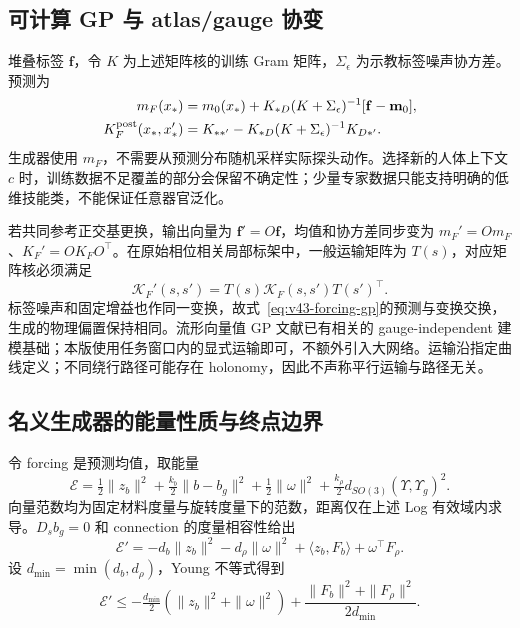 \documentclass[11pt,a4paper]{article}
\numberwithin{equation}{section}
\theoremstyle{definition}
\begin{document}
\subsection{可计算 GP 与 atlas/gauge 协变}
堆叠标签 $\mathbf f$，令 $K$ 为上述矩阵核的训练 Gram 矩阵，$\Sigma_\epsilon$ 为示教标签噪声协方差。预测为
\begin{align}
 m_F(x_*)&=m_0(x_*)+K_{*D}(K+\Sigma_\epsilon)^{-1}
                         [\mathbf f-\mathbf m_0],\\
 K_F^{\rm post}(x_*,x_*')&=K_{**'}-
     K_{*D}(K+\Sigma_\epsilon)^{-1}K_{D*'}.
 \label{eq:v43-forcing-gp}
\end{align}
生成器使用 $m_F$，不需要从预测分布随机采样实际探头动作。选择新的人体上下文 $c$ 时，训练数据不足覆盖的部分会保留不确定性；少量专家数据只能支持明确的低维技能类，不能保证任意器官泛化。

若共同参考正交基更换，输出向量为 $\mathbf f'=O\mathbf f$，均值和协方差同步变为 $m_F'=Om_F$、$K_F'=OK_FO^\top$。在原始相位相关局部标架中，一般运输矩阵为 $T(s)$，对应矩阵核必须满足
\begin{equation}
 \mathcal K_F'(s,s')=T(s)\mathcal K_F(s,s')T(s')^\top.
 \label{eq:v43-gauge-kernel}
\end{equation}
标签噪声和固定增益也作同一变换，故式~\eqref{eq:v43-forcing-gp}的预测与变换交换，生成的物理偏置保持相同。流形向量值 GP 文献已有相关的 gauge-independent 建模基础\cite{gpmanifold2021}；本版使用任务窗口内的显式运输即可，不额外引入大网络。运输沿指定曲线定义；不同绕行路径可能存在 holonomy，因此不声称平行运输与路径无关。

\subsection{名义生成器的能量性质与终点边界}
令 forcing 是预测均值，取能量
\begin{equation}
 \mathcal E=\tfrac12\|z_b\|^2+
 \tfrac{k_b}{2}\|b-b_g\|^2+
 \tfrac12\|\omega\|^2+
 \tfrac{k_\rho}{2}d_{SO(3)}(\Upsilon,\Upsilon_g)^2.
 \label{eq:v43-skill-energy}
\end{equation}
向量范数均为固定材料度量与旋转度量下的范数，距离仅在上述 Log 有效域内求导。$D_sb_g=0$ 和 connection 的度量相容性给出
\begin{equation}
 \mathcal E'=-d_b\|z_b\|^2-d_\rho\|\omega\|^2
               +\langle z_b,F_b\rangle+\omega^\top F_\rho.
 \label{eq:v43-energy-identity}
\end{equation}
设 $d_{\min}=\min(d_b,d_\rho)$，Young 不等式得到
\begin{equation}
 \mathcal E'\le -\tfrac{d_{\min}}2
          (\|z_b\|^2+\|\omega\|^2)
             +\frac{\|F_b\|^2+\|F_\rho\|^2}{2d_{\min}}.
 \label{eq:v43-energy-inequality}
\end{equation}
\end{document}
